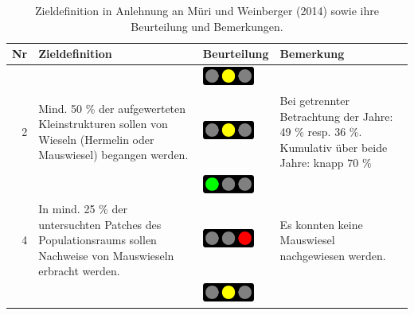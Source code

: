 \documentclass[
  oneside]{scrbook}
\begin{document}
\begin{table}

\caption{\label{tab:winziele}Zieldefinition in Anlehnung an Müri und Weinberger (2014) sowie ihre Beurteilung und Bemerkungen.}
\centering
\begin{tabular}[t]{rp{65mm}>{}lp{60mm}}
\toprule
Nr & Zieldefinition & Beurteilung & Bemerkung\\
\midrule
\cellcolor{gray!6}{1} & \cellcolor{gray!6}{In jedem Populationsraum sollen zu jeder Kontrollperiode Mauswiesel und Hermelin nachgewiesen werden.} & \cellcolor{gray!6}{}\includegraphics[width=0.67in, height=0.24in]{images/ampel_gelb.png} & \cellcolor{gray!6}{Es konnten zwar Hermeline, aber keine Mauswiesel nachgewiesen werden.}\\
2 & Mind. 50 \% der aufgewerteten Kleinstrukturen sollen von Wieseln (Hermelin oder Mauswiesel) begangen werden. & \includegraphics[width=0.67in, height=0.24in]{images/ampel_gelb.png} & Bei getrennter Betrachtung der Jahre: 49 \% resp. 36 \%. Kumulativ über beide Jahre: knapp 70 \%\\
\cellcolor{gray!6}{3} & \cellcolor{gray!6}{In mind. 75 \% der untersuchten Patches des Populationsraums sollen Nachweise von Hermelinen erbracht werden.} & \cellcolor{gray!6}{}\includegraphics[width=0.67in, height=0.24in]{images/ampel_gruen.png} & \cellcolor{gray!6}{In 10 von 11 untersuchten Patches (91 \%) konnten Nachweise von Hermelinen erbracht werden.}\\
4 & In mind. 25 \% der untersuchten Patches des Populationsraums sollen Nachweise von Mauswieseln erbracht werden. & \includegraphics[width=0.67in, height=0.24in]{images/ampel_rot.png} & Es konnten keine Mauswiesel nachgewiesen werden.\\
\cellcolor{gray!6}{5} & \cellcolor{gray!6}{In jeder untersuchten Verbindungsachse sollen mindestens einmal pro Jahr Wiesel (mindestens Hermeline) nachgewiesen werden.} & \cellcolor{gray!6}{}\includegraphics[width=0.67in, height=0.24in]{images/ampel_gelb.png} & \cellcolor{gray!6}{Gemäss Datensatz A konnten auf 4 von 5 kontrollierten Korridoren Nachweise von Hermelin und Iltis gemacht werden}\\
\bottomrule
\end{tabular}
\end{table}
\end{document}
